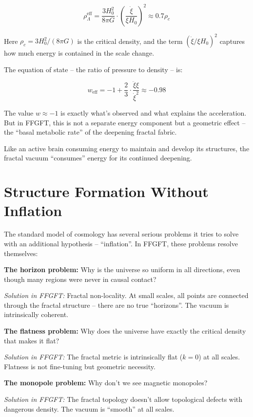 \documentclass[12pt,a4paper]{article}
\begin{document}
\begin{equation}
\rho_{\Lambda}^{\text{eff}} = \frac{3H_0^2}{8\pi G} \cdot \left(\frac{\dot{\xi}}{\xi H_0}\right)^2 \approx 0.7 \rho_c
\end{equation}

Here $\rho_c = 3H_0^2/(8\pi G)$ is the critical density, and the term $(\dot{\xi}/\xi H_0)^2$ captures how much energy is contained in the scale change.

The equation of state -- the ratio of pressure to density -- is:

\begin{equation}
w_{\text{eff}} = -1 + \frac{2}{3} \cdot \frac{\ddot{\xi}\xi}{\dot{\xi}^2} \approx -0.98
\end{equation}

The value $w \approx -1$ is exactly what's observed and what explains the acceleration. But in FFGFT, this is not a separate energy component but a geometric effect -- the ``basal metabolic rate'' of the deepening fractal fabric.

Like an active brain consuming energy to maintain and develop its structures, the fractal vacuum ``consumes'' energy for its continued deepening.

\section{Structure Formation Without Inflation}

The standard model of cosmology has several serious problems it tries to solve with an additional hypothesis -- ``inflation''. In FFGFT, these problems resolve themselves:

\textbf{The horizon problem:} Why is the universe so uniform in all directions, even though many regions were never in causal contact?

\textit{Solution in FFGFT:} Fractal non-locality. At small scales, all points are connected through the fractal structure -- there are no true ``horizons''. The vacuum is intrinsically coherent.

\textbf{The flatness problem:} Why does the universe have exactly the critical density that makes it flat?

\textit{Solution in FFGFT:} The fractal metric is intrinsically flat ($k=0$) at all scales. Flatness is not fine-tuning but geometric necessity.

\textbf{The monopole problem:} Why don't we see magnetic monopoles?

\textit{Solution in FFGFT:} The fractal topology doesn't allow topological defects with dangerous density. The vacuum is ``smooth'' at all scales.
\end{document}
